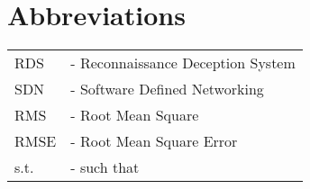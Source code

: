 \chapter*{Abbreviations}
\begin{center}
\begin{tabular}{ll}
        RDS       &- Reconnaissance Deception System \\
        SDN       &- Software Defined Networking \\
        RMS       &- Root Mean Square \\
        RMSE      &- Root Mean Square Error \\
        s.t.      &- such that    
      \end{tabular}
\end{center}
\newpage
~\clearpage


